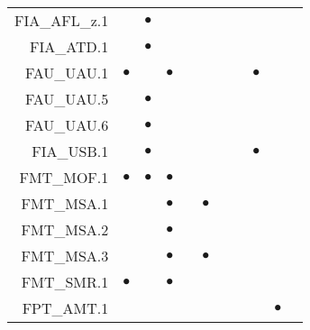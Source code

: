 \documentclass[12pt,english]{scrbook}
\newcommand{\oh}{$\bullet$}
\begin{document}
\begin{table}
\begin{tabular}{rRRRRRRRRRR}
FIA\_AFL\_z.1       &            &  \oh           &               &          &               &                        &      &                    &                 &                    \\   
FIA\_ATD.1          &            &  \oh           &               &          &               &                        &      &                    &                 &                    \\   
FAU\_UAU.1          & \oh        &                &  \oh          &          &               &                        &      & \oh                &                 &                    \\   
FAU\_UAU.5          &            &  \oh           &               &          &               &                        &      &                    &                 &                    \\   
FAU\_UAU.6          &            &  \oh           &               &          &               &                        &      &                    &                 &                    \\   
FIA\_USB.1          &            &  \oh           &               &          &               &                        &      &  \oh               &                 &                    \\   
FMT\_MOF.1          & \oh        &  \oh           &  \oh          &          &               &                        &      &                    &                 &                    \\   
FMT\_MSA.1          &            &                &  \oh          &          & \oh           &                        &      &                    &                 &                    \\   
FMT\_MSA.2          &            &                &  \oh          &          &               &                        &      &                    &                 &                    \\   
FMT\_MSA.3          &            &                &  \oh          &          & \oh           &                        &      &                    &                 &                    \\   
FMT\_SMR.1          & \oh        &                &  \oh          &          &               &                        &      &                    &                 &                    \\   
FPT\_AMT.1          &            &                &               &          &               &                        &      &                    &    \oh          &                    \\   

\end{tabular}
\end{table}
\end{document}
